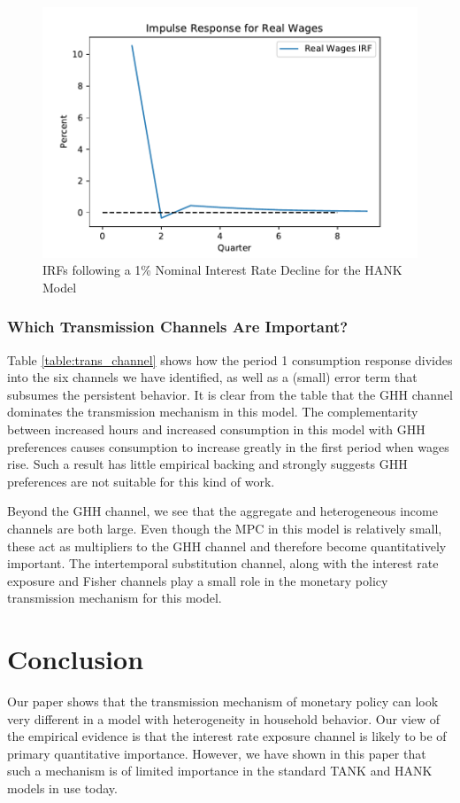 \documentclass[titlepage]{\econtex}\newcommand{\texname}{ConsumptionHeterogeneity}
\begin{document}
\begin{figure}
\begin{centering}
		\includegraphics[scale=0.45]{../Python/Figures/IRF_W.pdf}
		\caption{IRFs following a 1\% Nominal Interest Rate Decline for the HANK Model}
		\label{fig:HANK_IRFs}
	\end{centering}
\end{figure}

\subsubsection{Which Transmission Channels Are Important?}
Table \ref{table:trans_channel} shows how the period 1 consumption response divides into the six channels we have identified, as well as a (small) error term that subsumes the persistent behavior. It is clear from the table that the GHH channel dominates the transmission mechanism in this model. The complementarity between increased hours and increased consumption in this model with GHH preferences causes consumption to increase greatly in the first period when wages rise. Such a result has little empirical backing and strongly suggests GHH preferences are not suitable for this kind of work.

Beyond the GHH channel, we see that the aggregate and heterogeneous income channels are both large. Even though the MPC in this model is relatively small, these act as multipliers to the GHH channel and therefore become quantitatively important. The intertemporal substitution channel, along with the interest rate exposure and Fisher channels play a small role in the monetary policy transmission mechanism for this model.



\section{Conclusion}
Our paper shows that the transmission mechanism of monetary policy can look very different in a model with heterogeneity in household behavior. Our view of the empirical evidence is that the interest rate exposure channel is likely to be of primary quantitative importance. However, we have shown in this paper that such a mechanism is of limited importance in the standard TANK and HANK models in use today.
\end{document}
